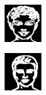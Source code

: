 \documentclass{IEEEcsmag}
\begin{document}
\begin{figure}[ht]
    \begin{subfigure}{0.12\textwidth}
        \includegraphics[width=\linewidth]{Prompted/edge_map_resized/image4.png}
    \end{subfigure}
    \begin{subfigure}{0.12\textwidth}
        \includegraphics[width=\linewidth]{Digital sketches/edge_map_resized/image16.jpeg}

\end{subfigure}
\end{figure}
\end{document}
